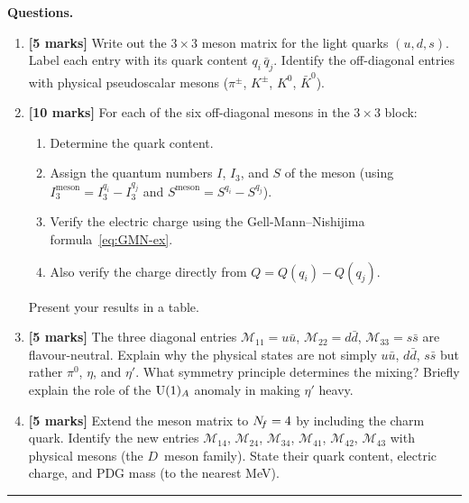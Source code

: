 \documentclass[11pt,a4paper]{article}
\begin{document}
\noindent\textbf{Questions.}
\begin{enumerate}[label=(\alph*)]

  \item \textbf{[5 marks]}
    Write out the $3 \times 3$ meson matrix for the light quarks
    $(u, d, s)$.  Label each entry with its quark content
    $q_i\,\bar{q}_j$.  Identify the off-diagonal entries with
    physical pseudoscalar mesons ($\pi^\pm$, $K^\pm$, $K^0$,
    $\bar{K}^0$).

  \item \textbf{[10 marks]}
    For each of the six off-diagonal mesons in the $3 \times 3$ block:
    \begin{enumerate}[label=(\roman*)]
      \item Determine the quark content.
      \item Assign the quantum numbers $I$, $I_3$, and $S$ of the
        meson (using $I_3^{\text{meson}} = I_{3}^{q_i} - I_{3}^{q_j}$
        and $S^{\text{meson}} = S^{q_i} - S^{q_j}$).
      \item Verify the electric charge using the Gell-Mann--Nishijima
        formula~\eqref{eq:GMN-ex}.
      \item Also verify the charge directly from
        $Q = Q(q_i) - Q(q_j)$.
    \end{enumerate}
    Present your results in a table.

  \item \textbf{[5 marks]}
    The three diagonal entries $\mathcal{M}_{11} = u\bar{u}$,
    $\mathcal{M}_{22} = d\bar{d}$, $\mathcal{M}_{33} = s\bar{s}$
    are flavour-neutral.  Explain why the physical states are not
    simply $u\bar{u}$, $d\bar{d}$, $s\bar{s}$ but rather
    $\pi^0$, $\eta$, and $\eta'$.  What symmetry principle
    determines the mixing?  Briefly explain the role of the
    $\mathrm{U}(1)_A$ anomaly in making $\eta'$ heavy.

  \item \textbf{[5 marks]}
    Extend the meson matrix to $N_{\!f} = 4$ by including the charm
    quark.  Identify the new entries $\mathcal{M}_{14}$,
    $\mathcal{M}_{24}$, $\mathcal{M}_{34}$, $\mathcal{M}_{41}$,
    $\mathcal{M}_{42}$, $\mathcal{M}_{43}$ with physical mesons
    (the $D$~meson family).  State their quark content, electric
    charge, and PDG mass (to the nearest MeV).

\end{enumerate}


\bigskip
\hrule
\bigskip
\end{document}
